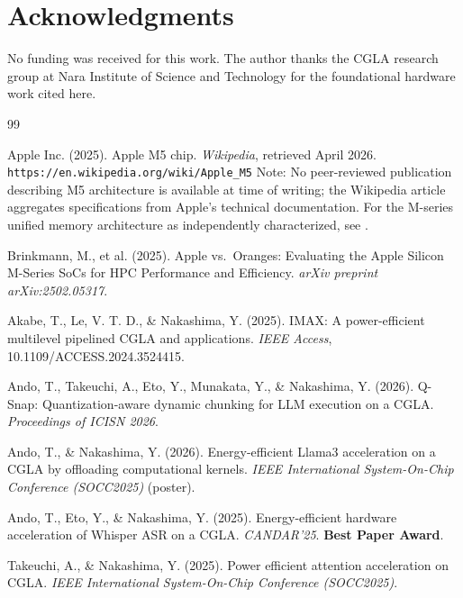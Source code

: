 \documentclass[12pt]{article}
\begin{document}
\section*{Acknowledgments}

No funding was received for this work. The author thanks the CGLA research
group at Nara Institute of Science and Technology for the foundational
hardware work cited here.

\begin{thebibliography}{99}

Apple Inc. (2025). Apple M5 chip. \textit{Wikipedia},
retrieved April 2026.
\texttt{https://en.wikipedia.org/wiki/Apple\_M5}
Note: No peer-reviewed publication describing M5 architecture
is available at time of writing; the Wikipedia article
aggregates specifications from Apple's technical documentation.
For the M-series unified memory architecture
as independently characterized, see \cite{brinkmann2025}.

Brinkmann, M., et al. (2025). Apple vs.\ Oranges: Evaluating
the Apple Silicon M-Series SoCs for HPC Performance and
Efficiency. \textit{arXiv preprint arXiv:2502.05317}.

Akabe, T., Le, V. T. D., \& Nakashima, Y. (2025). IMAX: A power-efficient
multilevel pipelined CGLA and applications. \textit{IEEE Access},
10.1109/ACCESS.2024.3524415.

Ando, T., Takeuchi, A., Eto, Y., Munakata, Y., \& Nakashima, Y. (2026).
Q-Snap: Quantization-aware dynamic chunking for LLM execution on a CGLA.
\textit{Proceedings of ICISN 2026}.

Ando, T., \& Nakashima, Y. (2026). Energy-efficient Llama3 acceleration
on a CGLA by offloading computational kernels. \textit{IEEE International
System-On-Chip Conference (SOCC2025)} (poster).

Ando, T., Eto, Y., \& Nakashima, Y. (2025). Energy-efficient hardware
acceleration of Whisper ASR on a CGLA. \textit{CANDAR'25}.
\textbf{Best Paper Award}.

Takeuchi, A., \& Nakashima, Y. (2025). Power efficient attention
acceleration on CGLA. \textit{IEEE International System-On-Chip
Conference (SOCC2025)}.


\end{thebibliography}
\end{document}
